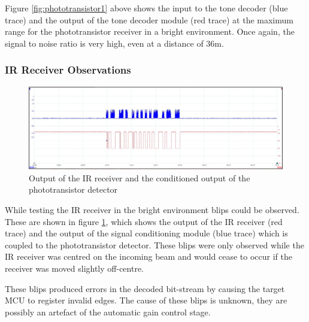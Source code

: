 Figure \ref{fig:phototransistor1} above shows the input to the tone decoder (blue trace) and the output of the tone decoder module (red trace) at the maximum range for the phototransistor receiver in a bright environment. Once again, the signal to noise ratio is very high, even at a distance of 36m.


\subsubsection{IR Receiver Observations}

\begin{figure}[H]
	\centering
	\includegraphics[width=.9\textwidth]{figures/results/system_test/36m_phototranaistoroutput_vs_ir_receiver.JPG}
	\caption{Output of the IR receiver and the conditioned output of the phototransistor detector}
	\label{fig:36m_phototranaistoroutput_vs_receiveroutput}
\end{figure}

While testing the IR receiver in the bright environment blips could be observed. These are shown in figure \ref{fig:36m_phototranaistoroutput_vs_receiveroutput}, which shows the output of the IR receiver (red trace) and the output of the signal conditioning module (blue trace) which is coupled to the phototransistor detector. These blips were only observed while the IR receiver was centred on the incoming beam and would cease to occur if the receiver was moved slightly off-centre.

These blips produced errors in the decoded bit-stream by causing the target MCU to register invalid edges. The cause of these blips is unknown, they are possibly an artefact of the automatic gain control stage.

